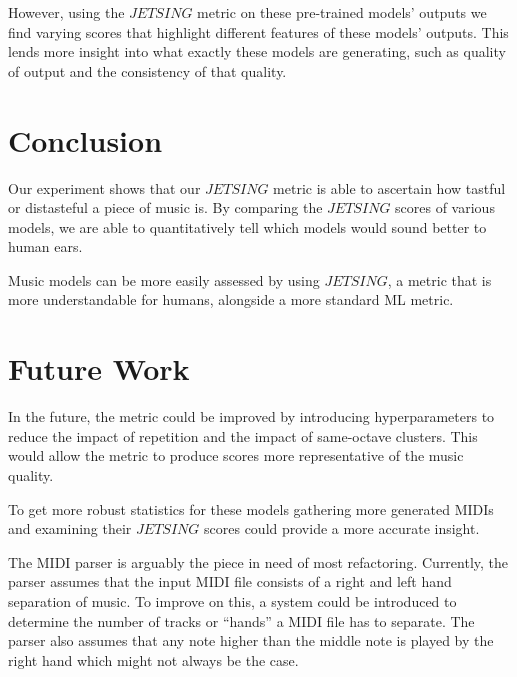 \documentclass[11pt]{article}
\begin{document}
However, using the $JETSING$ metric on these pre-trained models' outputs we find varying scores that highlight different features of these models' outputs.
This lends more insight into what exactly these models are generating, such as quality of output and the consistency of that quality.

\section{Conclusion}

Our experiment shows that our $JETSING$ metric is able to ascertain how tastful or distasteful a piece of music is.
By comparing the $JETSING$ scores of various models, we are able to quantitatively tell which models would sound better to human ears.

Music models can be more easily assessed by using $JETSING$, a metric that is more understandable for humans, alongside a more standard ML metric.

\section{Future Work}

In the future, the metric could be improved by introducing hyperparameters to reduce the impact of repetition and the impact of same-octave clusters.
This would allow the metric to produce scores more representative of the music quality.

To get more robust statistics for these models gathering more generated MIDIs and examining their $JETSING$ scores could provide a more accurate insight.

The MIDI parser is arguably the piece in need of most refactoring.
Currently, the parser assumes that the input MIDI file consists of a right and left hand separation of music.
To improve on this, a system could be introduced to determine the number of tracks or “hands” a MIDI file has to separate.
The parser also assumes that any note higher than the middle note is played by the right hand which might not always be the case.




\nocite{huang2018music, kotecha2018generating, vaswani2017attention, zhao2020verticalhorizontal, performance-rnn-2017, musicVAE}
\end{document}
